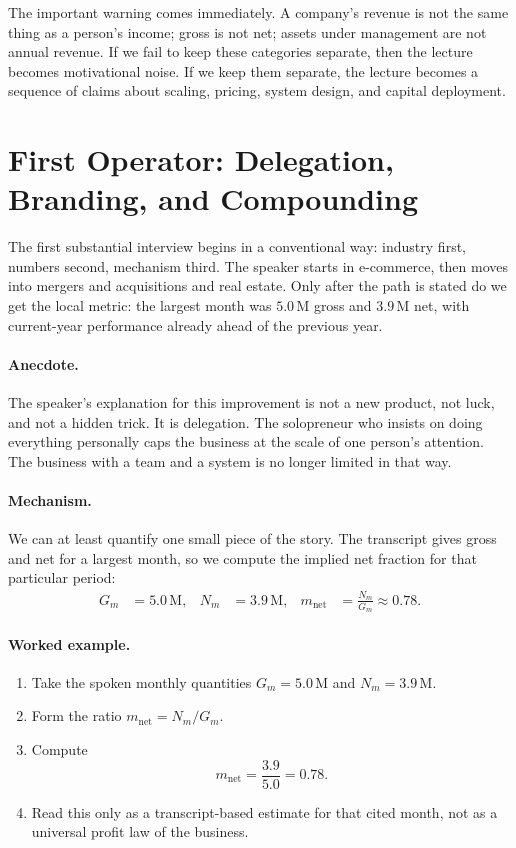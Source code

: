 The important warning comes immediately. A company's revenue is not the same thing as a person's income; gross is not net; assets under management are not annual revenue. If we fail to keep these categories separate, then the lecture becomes motivational noise. If we keep them separate, the lecture becomes a sequence of claims about scaling, pricing, system design, and capital deployment.

\section{First Operator: Delegation, Branding, and Compounding}

The first substantial interview begins in a conventional way: industry first, numbers second, mechanism third. The speaker starts in e-commerce, then moves into mergers and acquisitions and real estate. Only after the path is stated do we get the local metric: the largest month was \(5.0\,\mathrm{M}\) gross and \(3.9\,\mathrm{M}\) net, with current-year performance already ahead of the previous year.

\paragraph{Anecdote.}
The speaker's explanation for this improvement is not a new product, not luck, and not a hidden trick. It is delegation. The solopreneur who insists on doing everything personally caps the business at the scale of one person's attention. The business with a team and a system is no longer limited in that way.

\paragraph{Mechanism.}
We can at least quantify one small piece of the story. The transcript gives gross and net for a largest month, so we compute the implied net fraction for that particular period:
\begin{align}
G_m &= 5.0\,\mathrm{M}, &
N_m &= 3.9\,\mathrm{M}, &
m_{\text{net}} &= \frac{N_m}{G_m}\approx 0.78.
\end{align}

\paragraph{Worked example.}
\begin{enumerate}
\item Take the spoken monthly quantities \(G_m=5.0\,\mathrm{M}\) and \(N_m=3.9\,\mathrm{M}\).
\item Form the ratio \(m_{\text{net}}=N_m/G_m\).
\item Compute
\[
m_{\text{net}}=\frac{3.9}{5.0}=0.78.
\]
\item Read this only as a transcript-based estimate for that cited month, not as a universal profit law of the business.
\end{enumerate}

